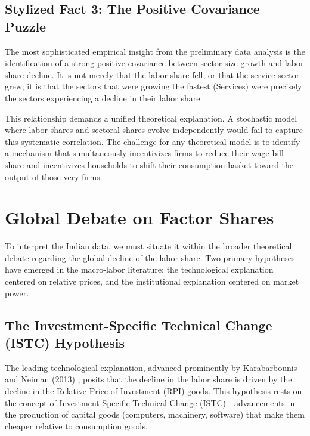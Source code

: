 \documentclass[12pt]{article}
\begin{document}
\subsection{Stylized Fact 3: The Positive Covariance Puzzle}
The most sophisticated empirical insight from the preliminary data analysis is the identification of a strong positive covariance between sector size growth and labor share decline. It is not merely that the labor share fell, or that the service sector grew; it is that the sectors that were growing the fastest (Services) were precisely the sectors experiencing a decline in their labor share.

This relationship demands a unified theoretical explanation. A stochastic model where labor shares and sectoral shares evolve independently would fail to capture this systematic correlation. The challenge for any theoretical model is to identify a mechanism that simultaneously incentivizes firms to reduce their wage bill share and incentivizes households to shift their consumption basket toward the output of those very firms.

\newpage
\section{Global Debate on Factor Shares}

To interpret the Indian data, we must situate it within the broader theoretical debate regarding the global decline of the labor share. Two primary hypotheses have emerged in the macro-labor literature: the technological explanation centered on relative prices, and the institutional explanation centered on market power.

\subsection{The Investment-Specific Technical Change (ISTC) Hypothesis}
The leading technological explanation, advanced prominently by Karabarbounis and Neiman (2013) \citep{Karabarbounis2013}, posits that the decline in the labor share is driven by the decline in the Relative Price of Investment (RPI) goods. This hypothesis rests on the concept of Investment-Specific Technical Change (ISTC)—advancements in the production of capital goods (computers, machinery, software) that make them cheaper relative to consumption goods.
\end{document}
